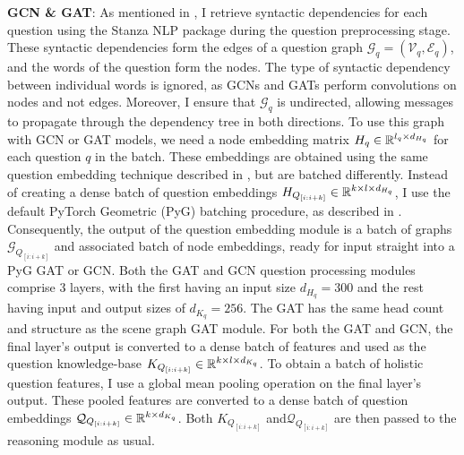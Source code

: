 \textbf{GCN \& GAT}: As mentioned in \sectionautorefname{ \ref{section:question_embedding_and_module}}, I retrieve syntactic dependencies for each question using the Stanza NLP package \cite{qi2020stanza} during the question preprocessing stage. These syntactic dependencies form the edges of a question graph \(\mathcal{G}_q = (\mathcal{V}_q, \mathcal{E}_q)\), and the words of the question form the nodes. The type of syntactic dependency between individual words is ignored, as GCNs and GATs perform convolutions on nodes and not edges. Moreover, I ensure that \(\mathcal{G}_q\) is undirected, allowing messages to propagate through the dependency tree in both directions. To use this graph with GCN or GAT models, we need a node embedding matrix \(H_q \in \mathbb{R}^{l_q \times d_{H_q}}\) for each question \(q\) in the batch. These embeddings are obtained using the same question embedding technique described in \sectionautorefname{ \ref{section:question_embedding_and_module}}, but are batched differently. Instead of creating a dense batch of question embeddings \(H_{Q_{[i:i+k]}} \in \mathbb{R}^{k \times l \times d_{H_q}}\), I use the default PyTorch Geometric (PyG) \cite{fey2019fast} batching procedure, as described in \subsubsectionautorefname{ \ref{sec:scene_graph_embedding_details}}. Consequently, the output of the question embedding module is a batch of graphs \(\mathcal{G}_{Q_{[i:i+k]}}\) and associated batch of node embeddings, ready for input straight into a PyG GAT or GCN. Both the GAT and GCN question processing modules comprise 3 layers, with the first having an input size \(d_{H_q} = 300\) and the rest having input and output sizes of \(d_{K_q} = 256\). The GAT has the same head count and structure as the scene graph GAT module. For both the GAT and GCN, the final layer's output is converted to a dense batch of features and used as the question knowledge-base \(K_{Q_{[i:i+k]}} \in \mathbb{R}^{k \times l \times d_{K_q}}\). To obtain a batch of holistic question features, I use a global mean pooling operation on the final layer's output. These pooled features are converted to a dense batch of question embeddings \(\mathcal{Q}_{Q_{[i:i+k]}} \in \mathbb{R}^{k \times d_{K_q}}\). Both \(K_{Q_{[i:i+k]}}\) and\(\mathcal{Q}_{Q_{[i:i+k]}}\) are then passed to the reasoning module as usual.

